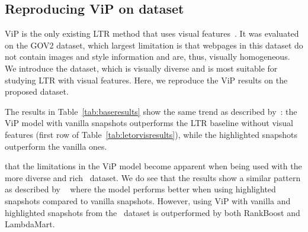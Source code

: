 \subsection{Reproducing ViP on \datasetname{} dataset}
ViP is the only existing \ac{LTR} method that uses visual features~\cite{fan2017learning}.
It was evaluated on the GOV2 dataset, which largest limitation is that webpages in this dataset do not contain images and style information and are, thus, visually homogeneous.
We introduce the \datasetname{} dataset, which is visually diverse and is most suitable for studying \ac{LTR} with visual features.
Here, we reproduce the ViP results on the proposed \datasetname{} dataset.

The results in Table~\ref{tab:baseresults} show the same trend as described by~\citet{fan2017learning}:
the ViP model with vanilla snapshots outperforms the \ac{LTR} baseline without visual features (first row of Table~\ref{tab:letorvisresults}),
while the highlighted snapshots outperform the vanilla ones.

that the limitations in the ViP model become apparent when being used with the more diverse and rich \datasetname~dataset. We do see that the results show a similar pattern as described by ~\citet{fan2017learning} where the model performs better when using highlighted snapshots compared to vanilla snapshots. However, using ViP with vanilla and highlighted snapshots from the \datasetname~dataset is outperformed by both RankBoost and LambdaMart. 
\fi




